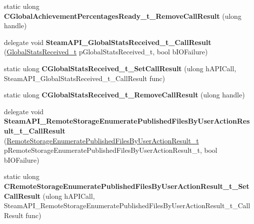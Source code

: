 \begin{DoxyCompactItemize}
static ulong {\bfseries C\+Global\+Achievement\+Percentages\+Ready\+\_\+t\+\_\+\+Remove\+Call\+Result} (ulong handle)
\item 
\mbox{\label{class_valve_1_1_interop_1_1_native_entrypoints_a91f9581d1b6431de74a5b2ed487f60c0}} 
delegate void {\bfseries Steam\+A\+P\+I\+\_\+\+Global\+Stats\+Received\+\_\+t\+\_\+\+Call\+Result} (\hyperlink{struct_valve_1_1_steamworks_1_1_global_stats_received__t}{Global\+Stats\+Received\+\_\+t} p\+Global\+Stats\+Received\+\_\+t, bool b\+I\+O\+Failure)
\item 
\mbox{\label{class_valve_1_1_interop_1_1_native_entrypoints_a33df33759366e6fae17100f5e7d2c594}} 
static ulong {\bfseries C\+Global\+Stats\+Received\+\_\+t\+\_\+\+Set\+Call\+Result} (ulong h\+A\+P\+I\+Call, Steam\+A\+P\+I\+\_\+\+Global\+Stats\+Received\+\_\+t\+\_\+\+Call\+Result func)
\item 
\mbox{\label{class_valve_1_1_interop_1_1_native_entrypoints_a7f4c4ea64e58a07b22c396b6009e9303}} 
static ulong {\bfseries C\+Global\+Stats\+Received\+\_\+t\+\_\+\+Remove\+Call\+Result} (ulong handle)
\item 
\mbox{\label{class_valve_1_1_interop_1_1_native_entrypoints_ae2ca15c7e32f40ea0485b002ff7e1012}} 
delegate void {\bfseries Steam\+A\+P\+I\+\_\+\+Remote\+Storage\+Enumerate\+Published\+Files\+By\+User\+Action\+Result\+\_\+t\+\_\+\+Call\+Result} (\hyperlink{struct_valve_1_1_steamworks_1_1_remote_storage_enumerate_published_files_by_user_action_result__t}{Remote\+Storage\+Enumerate\+Published\+Files\+By\+User\+Action\+Result\+\_\+t} p\+Remote\+Storage\+Enumerate\+Published\+Files\+By\+User\+Action\+Result\+\_\+t, bool b\+I\+O\+Failure)
\item 
\mbox{\label{class_valve_1_1_interop_1_1_native_entrypoints_a9b05ebb454a70c9e550a65dcfccb1440}} 
static ulong {\bfseries C\+Remote\+Storage\+Enumerate\+Published\+Files\+By\+User\+Action\+Result\+\_\+t\+\_\+\+Set\+Call\+Result} (ulong h\+A\+P\+I\+Call, Steam\+A\+P\+I\+\_\+\+Remote\+Storage\+Enumerate\+Published\+Files\+By\+User\+Action\+Result\+\_\+t\+\_\+\+Call\+Result func)
\item 

\end{DoxyCompactItemize}

